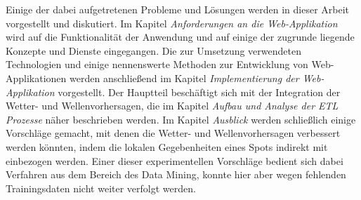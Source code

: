 Einige der dabei aufgetretenen Probleme und Lösungen werden in dieser
Arbeit vorgestellt und diskutiert. Im Kapitel \textit{Anforderungen an
  die Web-Applikation} wird auf die Funktionalität der Anwendung und
auf einige der zugrunde liegende Konzepte und Dienste eingegangen. Die
zur Umsetzung verwendeten Technologien und einige nennenswerte
Methoden zur Entwicklung von Web-Applikationen werden anschließend im
Kapitel \textit{Implementierung der Web-Applikation} vorgestellt. Der
Hauptteil beschäftigt sich mit der Integration der Wetter- und
Wellenvorhersagen, die im Kapitel \textit{Aufbau und Analyse der ETL
  Prozesse} näher beschrieben werden. Im Kapitel \textit{Ausblick}
werden schließlich einige Vorschläge gemacht, mit denen die Wetter-
und Wellenvorhersagen verbessert werden könnten, indem die lokalen
Gegebenheiten eines Spots indirekt mit einbezogen werden. Einer dieser
experimentellen Vorschläge bedient sich dabei Verfahren aus dem
Bereich des Data Mining, konnte hier aber wegen fehlenden
Trainingsdaten nicht weiter verfolgt werden.

